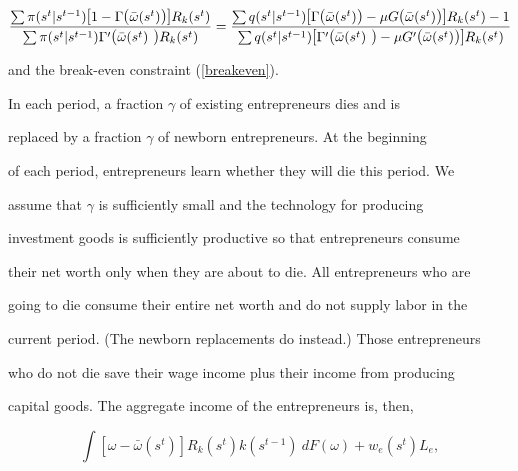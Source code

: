 \documentclass[fleqn,leqno,11pt]{article}
\begin{document}
\begin{equation}

\frac{\sum \pi (s^{t}|s^{t-1})\text{{\large [}}1-\Gamma \text{{\large (}}%

\bar{\omega}(s^{t})\text{{\large )]}}R_{k}(s^{t})}{\sum \pi

(s^{t}|s^{t-1})\Gamma ^{\prime }\text{{\large (}}\bar{\omega}(s^{t})\text{%

{\large )}}R_{k}(s^{t})}=\frac{\sum q(s^{t}|s^{t-1})\text{{\large [}}\Gamma 

\text{{\large (}}\bar{\omega}(s^{t})\text{{\large )}}-\mu G\text{{\large (}}%

\bar{\omega}(s^{t})\text{{\large )]}}R_{k}(s^{t})-1}{\sum q(s^{t}|s^{t-1})%

\text{{\large [}}\Gamma ^{\prime }\text{{\large (}}\bar{\omega}(s^{t})\text{%

{\large )}}-\mu G^{\prime }\text{{\large (}}\bar{\omega}(s^{t})\text{{\large %

)]}}R_{k}(s^{t})}  \label{OmegaBar}

\end{equation}

and the break-even constraint (\ref{breakeven}).



In each period, a fraction $\gamma $ of existing entrepreneurs dies and is

replaced by a fraction $\gamma $ of newborn entrepreneurs. At the beginning

of each period, entrepreneurs learn whether they will die this period. We

assume that $\gamma $ is sufficiently small and the technology for producing

investment goods is sufficiently productive so that entrepreneurs consume

their net worth only when they are about to die. All entrepreneurs who are

going to die consume their entire net worth and do not supply labor in the

current period. (The newborn replacements do instead.) Those entrepreneurs

who do not die save their wage income plus their income from producing

capital goods. The aggregate income of the entrepreneurs is, then, 

\[

\int \left[ \omega -\bar{\omega}(s^{t})\right] R_{k}(s^{t})k(s^{t-1})~dF(%

\omega )+w_{e}(s^{t})L_{e}, 

\]
\end{document}
